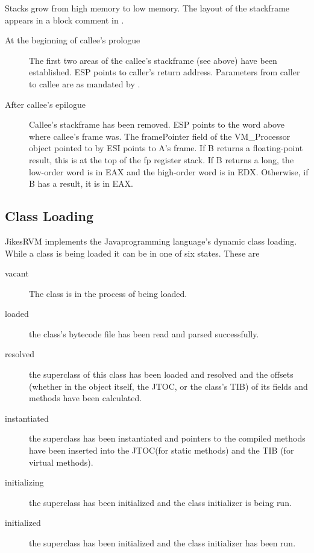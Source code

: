 
Stacks grow from high memory to low memory.
The layout of the stackframe appears in a block comment in
{\LintelStackframeLayoutURL}.


\begin{description}
\item[At the beginning of callee's prologue]
The first two areas of the callee's stackframe (see above) have been
     established.  ESP points to caller's return address.
     Parameters from caller to callee are as mandated by 
{\LintelRegisterConstantsURL}.
\item[After callee's epilogue]
     Callee's stackframe has been removed.  ESP points to the word above where
     callee's frame was.  The framePointer field
     of the VM\_Processor object pointed to by ESI points to A's
     frame.  If B returns a floating-point result, this is at
     the top of the fp register stack.  If B returns a long, the
     low-order word is in EAX and the high-order word is in EDX.
     Otherwise, if B has a result, it is in EAX.

\end{description}

\JavaTMFooter

\AIXPPCTMFooter

\subsection{Class Loading} \label{sssec:classLoading}

Jikes\trademark RVM implements the Java\trademark programming
language's dynamic class loading. While a class is being loaded it can
be in one of six states. These are
\begin{description}
\item[vacant] The class is in the process of being loaded.
\item[loaded] the class's bytecode file has been read and parsed successfully.
\item[resolved] the superclass of this class has been loaded and resolved and
the offsets (whether in the object itself, the JTOC, or the class's
TIB) of its fields and methods have been calculated.
\item[instantiated] the superclass has been instantiated and pointers to the
compiled methods have been inserted into the JTOC(for static methods) and the
TIB (for virtual methods).
\item[initializing] the superclass has been initialized and the class
initializer is being run.
\item[initialized] the superclass has been initialized and the class
initializer has been run.
\end{description}

